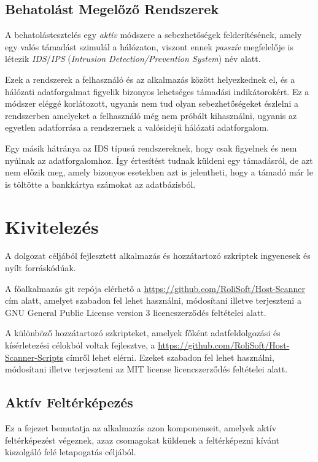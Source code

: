 \documentclass[a4paper,12pt]{article}
\begin{document}
\subsection{Behatolást Megelőző Rendszerek}
	
	A behatolástesztelés egy \textit{aktív} módszere a sebezhetőségek felderítésének, amely egy valós támadást szimulál a hálózaton, viszont ennek \textit{passzív} megfelelője is létezik \textit{IDS}/\textit{IPS} (\textit{Intrusion Detection/Prevention System}) név alatt.
	
	Ezek a rendszerek a felhasználó és az alkalmazás között helyezkednek el, és a hálózati adatforgalmat figyelik bizonyos lehetséges támadási indikátorokért. Ez a módszer eléggé korlátozott, ugyanis nem tud olyan sebezhetőségeket észlelni a rendszerben amelyeket a felhasználó még nem próbált kihasználni, ugyanis az egyetlen adatforrása a rendszernek a valósidejű hálózati adatforgalom.
	
	Egy másik hátránya az IDS típusú rendszereknek, hogy csak figyelnek és nem nyúlnak az adatforgalomhoz. Így értesítést tudnak küldeni egy támadásról, de azt nem előzik meg, amely bizonyos esetekben azt is jelentheti, hogy a támadó már le is töltötte a bankkártya számokat az adatbázisból.

\section{Kivitelezés}

	A dolgozat céljából fejlesztett alkalmazás és hozzátartozó szkriptek ingyenesek és nyílt forráskódúak.

	A főalkalmazás git repója elérhető a \url{https://github.com/RoliSoft/Host-Scanner} cím alatt, amelyet szabadon fel lehet használni, módosítani illetve terjeszteni a GNU General Public License version 3\cite{gplv3} licencszerződés feltételei alatt.
	
	A különböző hozzátartozó szkripteket, amelyek főként adatfeldolgozási és kísérletezési célokból voltak fejlesztve, a \url{https://github.com/RoliSoft/Host-Scanner-Scripts} címről lehet elérni. Ezeket szabadon fel lehet használni, módosítani illetve terjeszteni az MIT license\cite{mit} licencszerződés feltételei alatt.

\subsection{Aktív Feltérképezés}

	Ez a fejezet bemutatja az alkalmazás azon komponenseit, amelyek aktív feltérképezést végeznek, azaz csomagokat küldenek a feltérképezni kívánt kiszolgáló felé letapogatás céljából.
\end{document}
